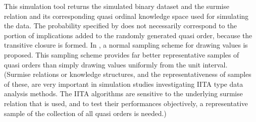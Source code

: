 \documentclass[nojss]{jss}
\begin{document}
This simulation tool returns the simulated binary dataset and the surmise relation and its corresponding quasi ordinal knowledge space used for simulating the data. 
The probability specified by  does not necessarily correspond to the portion of implications added to the randomly generated quasi order, 
because the transitive closure is formed. In \cite{SU:09}, a normal sampling scheme for drawing  
values is proposed. This sampling scheme provides far better representative samples of quasi orders than simply drawing  values uniformly 
from the unit interval. (Surmise relations or knowledge structures, and the representativeness of samples of these, are very important in simulation studies 
investigating IITA type data analysis methods. The IITA algorithms are sensitive to the underlying surmise relation that is used, and to test their 
performances objectively, a representative sample of the collection of all quasi orders is needed.)
\end{document}
